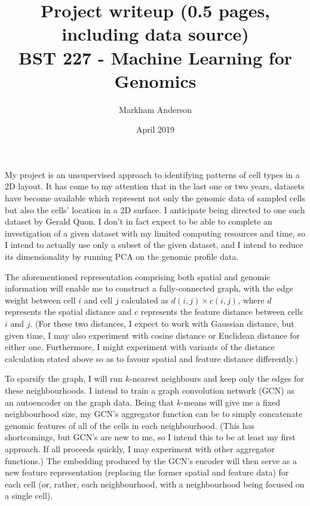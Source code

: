 \documentclass{article}
\title{Project writeup (0.5 pages, including data source) \\
\large BST 227 - Machine Learning for Genomics}
\author{Markham Anderson}
\date{April 2019}
\begin{document}
\maketitle


\normalsize
My project is an unsupervised approach to identifying patterns of cell types in a 2D layout. It has come to my attention that in the last one or two years, datasets have become available which represent not only the genomic data of sampled cells but also the cells' location in a 2D surface. I anticipate being directed to one such dataset by Gerald Quon. I don't in fact expect to be able to complete an investigation of a given dataset with my limited computing resources and time, so I intend to actually use only a subset of the given dataset, and I intend to reduce its dimensionality by running PCA on the genomic profile data.

The aforementioned representation comprising both spatial and genomic information will enable me to construct a fully-connected graph, with the edge weight between cell $i$ and cell $j$ calculated as $d(i,j)\times c(i,j)$, where $d$ represents the spatial distance and $c$ represents the feature distance between cells $i$ and $j$. (For these two distances, I expect to work with Gaussian distance, but given time, I may also experiment with cosine distance or Euclidean distance for either one. Furthermore, I might experiment with variants of the distance calculation stated above so as to favour spatial and feature distance differently.)

To sparsify the graph, I will run $k$-nearest neighbours and keep only the edges for these neighbourhoods. I intend to train a graph convolution network (GCN) as an autoencoder on the graph data. Being that $k$-means will give me a fixed neighbourhood size, my GCN's aggregator function can be to simply concatenate genomic features of all of the cells in each neighbourhood. (This has shortcomings, but GCN's are new to me, so I intend this to be at least my first approach. If all proceeds quickly, I may experiment with other aggregator functions.) The embedding produced by the GCN's encoder will then serve as a new feature representation (replacing the former spatial and feature data) for each cell (or, rather, each neighbourhood, with a neighbourhood being focused on a single cell).
\end{document}
